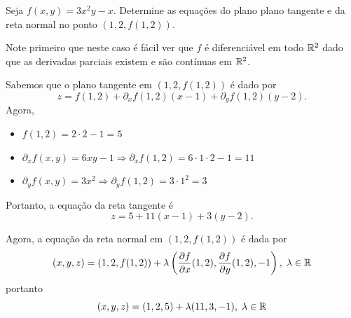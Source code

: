 \begin{example}
    Seja \(f(x,y) = 3x^2y - x\). Determine as equações do plano plano tangente e da reta normal no ponto \((1,2,f(1,2))\).

    Note primeiro que neste caso é fácil ver que \(f\) é diferenciável em todo \(\mathbb{R}^2\) dado que as derivadas parciais existem e são contínuas em \(\mathbb{R}^2\).

    Sabemos que o plano tangente em \((1,2,f(1,2))\) é dado por \[z = f(1,2) + \partial_x f(1,2)(x-1) + \partial_y f(1,2)(y-2).\] Agora,
        \begin{itemize}
            \item \(f(1,2) = 2\cdot 2 - 1 = 5\)
            \item \(\partial_x f(x,y) = 6xy - 1 \Rightarrow \partial_x f(1,2) = 6\cdot 1\cdot 2 - 1 = 11\)
            \item \(\partial_y f(x,y) = 3x^2 \Rightarrow \partial_y f(1,2) = 3\cdot 1^2 = 3\)
        \end{itemize}

    Portanto, a equação da reta tangente é \[z = 5 + 11(x-1) + 3(y-2).\]

    Agora, a equação da reta normal em \((1,2,f(1,2))\) é dada por \[(x,y,z) = (1,2,f(1,2)) + \lambda\left( \frac{\partial f}{\partial x}(1,2), \frac{\partial f}{\partial y}(1,2), -1 \right),\; \lambda\in\mathbb{R}\] portanto \[(x,y,z) = (1,2,5) + \lambda (11,3,-1),\; \lambda\in\mathbb{R}\]
\end{example}

